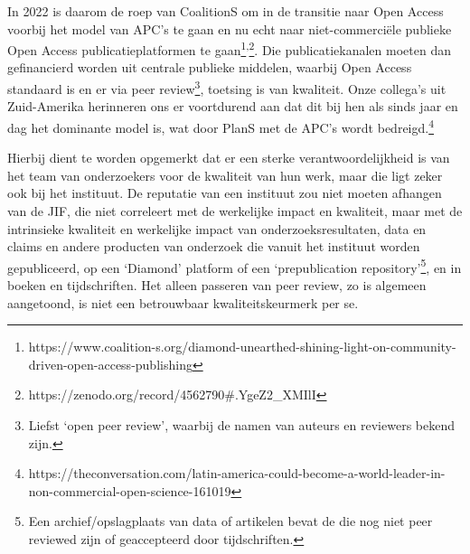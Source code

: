 \documentclass[empirical, authordate, ]{new-jote-article}
\begin{document}
	In 2022 is daarom de roep van CoalitionS om in de transitie naar Open Access voorbij het model van APC's te gaan en nu echt naar niet-commerciële publieke Open Access publicatieplatformen te gaan\footnote{https://www.coalition-s.org/diamond-unearthed-shining-light-on-community-driven-open-access-publishing}\textsuperscript{,}\footnote{https://zenodo.org/record/4562790\#.YgeZ2\_XMIlI}. Die publicatiekanalen moeten dan gefinancierd worden uit centrale publieke middelen, waarbij Open Access standaard is en er via peer review\footnote{Liefst ‘open peer review', waarbij de namen van auteurs en reviewers bekend zijn.}, toetsing is van kwaliteit. Onze collega's uit Zuid-Amerika herinneren ons er voortdurend aan dat dit bij hen als sinds jaar en dag het dominante model is, wat door PlanS met de APC's wordt bedreigd.\footnote{https://theconversation.com/latin-america-could-become-a-world-leader-in-non-commercial-open-science-161019}



	Hierbij dient te worden opgemerkt dat er een sterke verantwoordelijkheid is van het team van onderzoekers voor de kwaliteit van hun werk, maar die ligt zeker ook bij het instituut. De reputatie van een instituut zou niet moeten afhangen van de JIF, die niet correleert met de werkelijke impact en kwaliteit, maar met de intrinsieke kwaliteit en werkelijke impact van onderzoeksresultaten, data en claims en andere producten van onderzoek die vanuit het instituut worden gepubliceerd, op een ‘Diamond' platform of een ‘prepublication repository'\footnote{Een archief/opslagplaats van data of artikelen bevat de die nog niet peer reviewed zijn of geaccepteerd door tijdschriften.}, en in boeken en tijdschriften. Het alleen passeren van peer review, zo is algemeen aangetoond, is niet een betrouwbaar kwaliteitskeurmerk per se.
\end{document}
